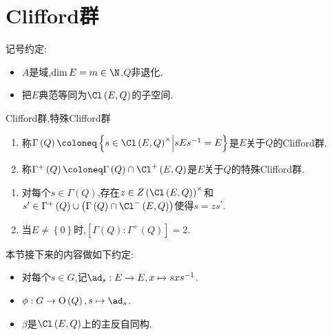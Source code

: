 \section{Clifford群}

记号约定:
\begin{itemize}
	\item $A$是域,$\dim E=m\in\N$,$Q$非退化.
	\item 把$E$典范等同为$\Cl\left(E,Q\right)$的子空间.
\end{itemize}

\begin{definition}{Clifford群,特殊Clifford群}{}
	\begin{enumerate}
		\item 称$\Gamma\left(Q\right)\coloneq\left\{s\in\Cl\left(E,Q\right)^{\times}\middle|sEs^{-1}=E\right\}$是$E$关于$Q$的Clifford群.
		\item 称$\Gamma^{+}\left(Q\right)\coloneq\Gamma\left(Q\right)\cap\Cl^{+}\left(E,Q\right)$是$E$关于$Q$的特殊Clifford群.
	\end{enumerate}
\end{definition}

\begin{lemma}{}{}
	\begin{enumerate}
		\item 对每个$s\in\Gamma\left(Q\right)$,存在$z\in Z\left(\Cl\left(E,Q\right)\right)^{\times}$和$s^{\prime}\in\Gamma^{+}\left(Q\right)\cup\left(\Gamma\left(Q\right)\cap\Cl^{-}\left(E,Q\right)\right)$使得$s=zs^{\prime}$.
		\item 当$E\neq\left\{0\right\}$时,$\left[\Gamma\left(Q\right):\Gamma^{+}\left(Q\right)\right]=2$.
	\end{enumerate}
\end{lemma}

本节接下来的内容做如下约定:
\begin{itemize}
	\item 对每个$s\in G$,记$\ad_{s}:E\to E,x\mapsto sxs^{-1}$.
	\item $\phi:G\to\mathrm{O}\left(Q\right),s\mapsto\ad_{s}$.
	\item $\beta$是$\Cl\left(E,Q\right)$上的主反自同构.
\end{itemize}

